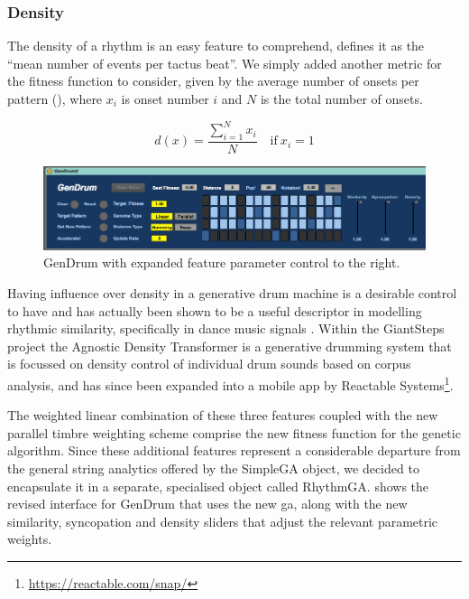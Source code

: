 {{\subsubsection{Density}

The density of a rhythm is an easy feature to comprehend, \cite{Wiggins2012a} defines it as the ``mean number of events per tactus beat''. We simply added another metric for the fitness function to consider, given by the average number of onsets per pattern (), where $x_i$ is onset number $i$ and $N$ is the total number of onsets.

\begin{equation}
\label{eq:density}
	d(x)=\frac{\sum_{i=1}^{N}x_i}{N} \quad \text{if}\ x_i=1
\end{equation}

\begin{figure}
	\begin{center}
		\includegraphics[width=1.0\textwidth]{ch03_symbolic/figures/gendrum2.png}
	\end{center}
	\caption[GenDrum with Expanded Feature Parameter Control]{GenDrum with expanded feature parameter control to the right.}
	\label{fig:gendrum2}
\end{figure}

Having influence over density in a generative drum machine is a desirable control to have and  has actually been shown to be a useful descriptor in modelling rhythmic similarity, specifically in dance music signals \citep{Panteli2014a}. Within the GiantSteps project the Agnostic Density Transformer \citep{Jorda2016} is a generative drumming system that is focussed on density control of individual drum sounds based on corpus analysis, and has since been expanded into a mobile app by Reactable Systems\footnote{\url{https://reactable.com/snap/}}.

The weighted linear combination of these three features coupled with the new parallel timbre weighting scheme comprise the new fitness function for the genetic algorithm. Since these additional features represent a considerable departure from the general string analytics offered by the SimpleGA object, we decided to encapsulate it in a separate, specialised object called RhythmGA.  shows the revised interface for GenDrum that uses the new \acrshort{ga}, along with the new similarity, syncopation and density  sliders that adjust the relevant parametric weights.

}}

